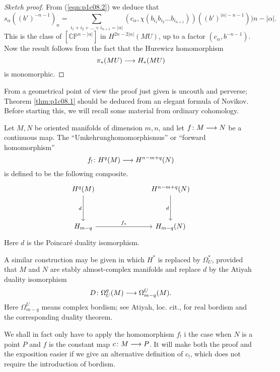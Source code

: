 \documentclass[../main]{subfiles}
\begin{document}
\begin{proof}[Sketch proof]
From (\ref{eqn:p1c08.2}) we deduce that
\[s_\alpha((b')^{-n-1})_n = \sum_{i_1 + i_2 + \dots + i_{n+1} = |\alpha|} (c_\alpha , \chi(b_{i_1} b_{i_2} \dots b_{i_{n+1}}))((b')^{|\alpha| - n - 1})){n-|\alpha|}.\]
This is the class of $[\mathbb{CP}^{n-|\alpha|}]$ in $H^{2n-2|\alpha|}(MU)$, up to a factor $(c_\alpha, b^{-n-1})$. Now the result follows from the fact that the Hurewicz homomorphism
\[\pi_*(MU) \longrightarrow H_*(MU)\]
is monomorphic.
\end{proof}

From a geometrical point of view the proof just given is uncouth and perverse; Theorem \ref{thm:p1c08.1} should be deduced from an elegant formula of Novikov. Before starting this, we will recall some material from ordinary cohomology.

Let $M,N$ be oriented manifolds of dimension $m,n$, and let $f \colon M \longrightarrow N$ be a continuous map. The ``Umkehrunghomomorphismus'' or ``forward homomorphism''
\[f_! \colon H^q(M) \longrightarrow H^{n-m+q}(N)\]
is defined to be the following composite.
\[\begin{tikzcd}
H^q(M) \arrow[dd, "d"']    &  &  & H^{n-m+q}(N) \arrow[dd, "d"'] \\
                           &  &  &                               \\
H_{m-q} \arrow[rrr, "f_*"] &  &  & H_{m-q}(N)                   
\end{tikzcd}\]
Here $d$ is the Poincar\'e duality isomorphism.

A similar construction may be given in which $H^*$ is replaced by $\Omega_U^*$, provided that $M$ and $N$ are stably almost-complex manifolds and replace $d$ by the Atiyah duality isomorphism
\[D \colon \Omega_U^q(M) \longrightarrow \Omega_{m-q}^U(M).\]
Here $\Omega_{m-q}^U$ means complex bordism; see Atiyah, loc. cit., for real bordism and the corresponding duality theorem.

We shall in fact only have to apply the homomorphism $f_!$ i the case when $N$ is a point $P$ and $f$ is the constant map $c \colon M \longrightarrow P$. It will make both the proof and the exposition easier if we give an alternative definition of $c_!$, which does not require the introduction of bordism.
\end{document}
